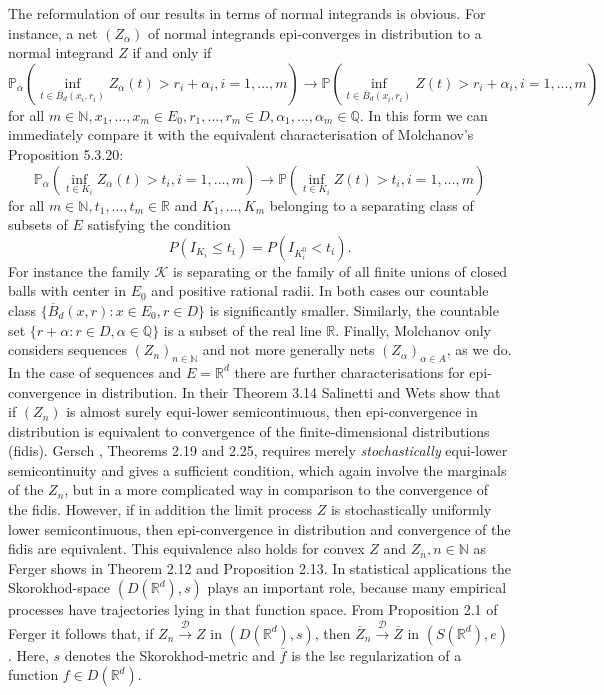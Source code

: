 \documentclass[sn-mathphys,Numbered]{sn-jnl}%
\theoremstyle{thmstyleone}%
\theoremstyle{thmstyletwo}%
\theoremstyle{thmstylethree}%
\begin{document}
The reformulation of our results in terms of normal integrands is obvious. For instance, a net $(Z_\alpha)$ of normal integrands epi-converges in distribution to a normal integrand $Z$ if and only if
$$
 \mathbb{P}_\alpha(\inf_{t \in \overline{B}_d(x_i,r_i)}Z_\alpha(t)>r_i+\alpha_i, i=1,\ldots,m) \rightarrow \mathbb{P}(\inf_{t \in \overline{B}_d(x_i,r_i)}Z(t)>r_i+\alpha_i, i=1,\ldots,m)
$$
for all $m \in \mathbb{N}, x_1,\ldots,x_m \in E_0, r_1,\ldots,r_m \in D, \alpha_1,\ldots,\alpha_m \in \mathbb{Q}.$ In this form we can immediately compare it with the equivalent characterisation of Molchanov's \cite{Molchanov} Proposition 5.3.20:
$$
 \mathbb{P}_\alpha(\inf_{t \in K_i}Z_\alpha(t)> t_i, i=1,\ldots,m) \rightarrow \mathbb{P}(\inf_{t \in K_i}Z(t)> t_i, i=1,\ldots,m)
$$
for all $m \in \mathbb{N}, t_1,\ldots,t_m \in \mathbb{R}$ and $K_1,\ldots,K_m$ belonging to a separating class of subsets of $E$ satisfying the condition
$$
P(I_{K_i} \le t_i )= P(I_{K_i^0} < t_i).
$$
For instance the family $\mathcal{K}$ is separating or the family of all finite unions of closed balls with center in $E_0$ and positive rational
radii. In both cases our countable class $\{\overline{B}_d(x,r): x \in E_0, r \in D\}$ is significantly smaller. Similarly, the countable set $\{r+\alpha: r \in D, \alpha \in \mathbb{Q}\}$ is a subset of the real line $\mathbb{R}$. Finally, Molchanov only considers sequences $(Z_n)_{n \in \mathbb{N}}$ and not more generally nets $(Z_\alpha)_{\alpha \in A}$, as we do. In the case of sequences and $E=\mathbb{R}^d$ there are further characterisations for epi-convergence in distribution. In their Theorem 3.14 Salinetti and Wets \cite{SalWe} show that if $(Z_n)$ is almost surely equi-lower semicontinuous, then epi-convergence in distribution is equivalent to convergence of the finite-dimensional distributions (fidis). Gersch \cite{Gersch}, Theorems 2.19 and 2.25, requires merely \emph{stochastically} equi-lower semicontinuity and gives a sufficient condition, which again involve the marginals of the $Z_n$, but in a more complicated way in comparison to the convergence of the fidis. However, if in addition the limit process $Z$ is stochastically uniformly lower semicontinuous, then epi-convergence in distribution and convergence of the fidis are equivalent. This equivalence also holds for convex $Z$ and $Z_n, n \in \mathbb{N}$ as Ferger \cite{Ferger1} shows in Theorem 2.12 and Proposition 2.13. In statistical applications the Skorokhod-space $(D(\mathbb{R}^d),s)$ plays an important role, because many empirical processes have trajectories lying in that function space. From Proposition 2.1 of Ferger \cite{Ferger4} it follows that, if $Z_n \stackrel{\mathcal{D}}{\rightarrow} Z$ in $(D(\mathbb{R}^d),s)$, then $\overline{Z}_n \stackrel{\mathcal{D}}{\rightarrow} \overline{Z}$ in $(S(\mathbb{R}^d),e)$. Here, $s$ denotes the Skorokhod-metric
and $\overline{f}$ is the lsc regularization of a function $f \in D(\mathbb{R}^d)$.\\
\end{document}
